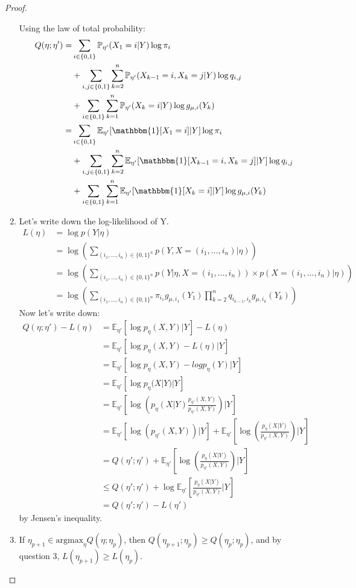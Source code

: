 \documentclass{article}
\begin{document}
\begin{proof}
\begin{enumerate}
Using the law of total probability:
\begin{align*}
Q(\eta ; \eta') = & \sum_{i \in \{0,1\}}\mathbb{P}_{\eta'} (X_1 = i | Y) \log \pi_{i}\\
&+ \sum_{i, j \in \{0,1\}}\sum_{k=2}^n \mathbb{P}_{\eta'}(X_{k-1} = i, X_k = j | Y) \log q_{i, j}\\
&+ \sum_{i \in \{0,1\}} \sum_{k=1}^n \mathbb{P}_{\eta'}(X_k = i | Y ) \log g_{\mu, i} (Y_k)\\
= & \sum_{i \in \{0,1\}}\mathbb{E}_{\eta'} [\mathbbm{1}[X_1 = i] | Y] \log \pi_{i}\\
&+ \sum_{i, j \in \{0,1\}}\sum_{k=2}^n \mathbb{E}_{\eta'}[\mathbbm{1}[X_{k-1} = i, X_k =j]| Y] \log q_{i, j}\\
&+ \sum_{i \in \{0,1\}} \sum_{k=1}^n \mathbb{E}_{\eta'}[\mathbbm{1}[X_k = i] | Y] \log g_{\mu, i} (Y_k)
\end{align*}
\item Let's write down the log-likelihood of Y.
\begin{align*}
L(\eta) &= \log p(Y | \eta)\\
&= \log \left( \sum_{(i_1, \dots, i_n) \in \{0,1\}^n} p\left(Y, X =(i_1, \ldots, i_n) | \eta \right) \right)\\
&= \log \left( \sum_{(i_1, \dots, i_n) \in \{0,1\}^n} p\left(Y | \eta, X =(i_1, \ldots, i_n) \right) \times p\left(X =(i_1, \ldots, i_n) | \eta \right)\right)\\
&= \log \left( \sum_{(i_1, \dots, i_n) \in \{0,1\}^n} \pi_{i_1} g_{\mu, i_1}(Y_1) \prod_{k=2}^n q_{i_{k-1}, i_k} g_{\mu, i_k}(Y_k)\right)
\end{align*}
Now let's write down:
\begin{align*}
Q(\eta ; \eta') - L(\eta) &= \mathbb{E}_{\eta'} [\log p_\eta(X, Y) | Y] - L(\eta)\\
&= \mathbb{E}_{\eta'} [\log p_\eta(X, Y) - L(\eta) | Y ]\\
&= \mathbb{E}_{\eta'} [\log p_\eta(X, Y) - log p_\eta(Y) | Y ]\\
&= \mathbb{E}_{\eta'} [\log p_\eta(X | Y) | Y ]\\
&= \mathbb{E}_{\eta'} [\log \left( p_\eta(X | Y) \frac{p_{\eta'}(X , Y)}{p_{\eta'}(X , Y)} \right) | Y ]\\
&= \mathbb{E}_{\eta'} [\log \left( p_{\eta'}(X , Y) \right) | Y ] + \mathbb{E}_{\eta'} [\log \left( \frac{p_\eta(X | Y)}{p_{\eta'}(X , Y)} \right) | Y ]\\
&= Q(\eta' ; \eta') + \mathbb{E}_{\eta'} \left[\log \left( \frac{p_\eta(X | Y)}{p_{\eta'}(X , Y)} \right) | Y \right]\\
& \leq Q(\eta' ; \eta') + \log \mathbb{E}_{\eta'} \left[ \frac{p_\eta(X | Y)}{p_{\eta'}(X , Y)} | Y \right]\\
&= Q(\eta' ; \eta') - L(\eta')
\end{align*}
by Jensen's inequality.
\item If $\eta_{p+1} \in \textrm{argmax}_{\eta} Q(\eta ; \eta_p)$, then $Q(\eta_{p+1} ; \eta_p) \geq Q(\eta_{p} ; \eta_p)$, and by question 3, $L(\eta_{p+1}) \geq L(\eta_p)$.
\end{enumerate}
\end{proof}
\end{document}
